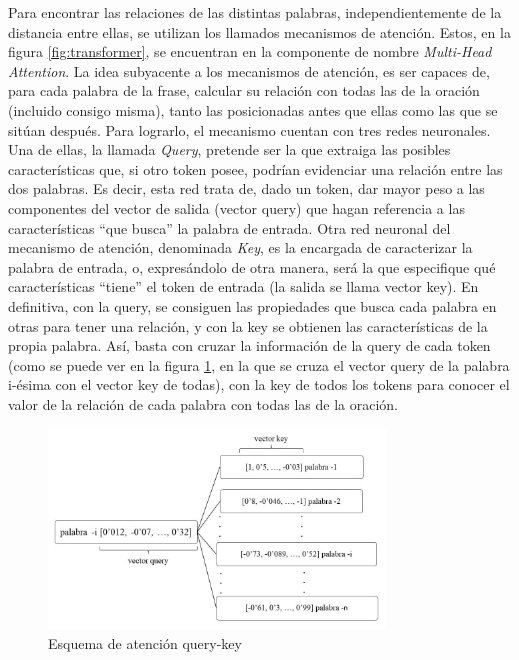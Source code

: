 Para encontrar las relaciones de las distintas palabras, independientemente de la distancia entre ellas, se utilizan los llamados mecanismos de atención. Estos, en la figura \ref{fig:transformer}, se encuentran en la componente de nombre \textit{Multi-Head Attention}. La idea subyacente a los mecanismos de atención, es ser capaces de, para cada palabra de la frase, calcular su relación con todas las de la oración (incluido consigo misma), tanto las posicionadas antes que ellas como las que se sitúan después. Para lograrlo, el mecanismo cuentan con tres redes neuronales. Una de ellas, la llamada \textit{Query}, pretende ser la que extraiga las posibles características que, si otro token posee, podrían evidenciar una relación entre las dos palabras. Es decir, esta red trata de, dado un token, dar mayor peso a las componentes del vector de salida (vector query) que hagan referencia a las características ``que busca'' la palabra de entrada. Otra red neuronal del mecanismo de atención, denominada \textit{Key}, es la encargada de caracterizar la palabra de entrada, o, expresándolo de otra manera, será la que especifique qué características ``tiene'' el token de entrada (la salida se llama vector key). En definitiva, con la query, se consiguen las propiedades que busca cada palabra en otras para tener una relación, y con la key se obtienen las características de la propia palabra. Así, basta con cruzar la información de la query de cada token (como se puede ver en la figura \ref{fig:querykey}, en la que se cruza el vector query de la palabra i-ésima con el vector key de todas), con la key de todos los tokens para conocer el valor de la relación de cada palabra con todas las de la oración.

\begin{figure}[h]
	\centering%
	\centerline{\includegraphics[width = 0.8\textwidth]{Imagenes/Bitmap/query-key.jpg}}%
	\caption{Esquema de atención query-key}%
	\label{fig:querykey}
\end{figure}

